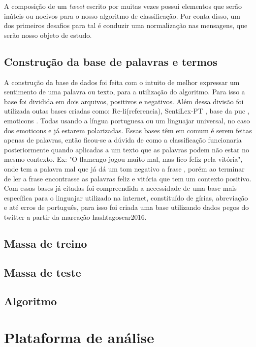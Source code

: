 A composição de um \textit{tweet} escrito por muitas vezes possui elementos que serão inúteis ou nocivos para o nosso algoritmo de classificação. Por conta disso, um dos primeiros desafios para tal é conduzir uma normalização nas mensagens, que serão nosso objeto de estudo.


\subsection{Construção da base de palavras e termos}
A construção da base de dados foi feita com o intuito de melhor expressar um sentimento de uma palavra ou texto, para a utilização do algoritmo. Para isso a base foi dividida em dois arquivos, positivos e negativos. Além dessa divisão foi utilizada outas bases criadas como: Re-li(referencia), SentiLex-PT \cite{marioj.silvapaulacarvalholuissarmento2012}, base da puc \cite{freitas2013construccao}, emoticons \cite{alexanderhogenboomdaniellabalflaviusfrasincarmalissabalfranciskadejonguzaykaymak}. Todas usando a língua portuguesa ou um linguajar universal, no caso dos emoticons e já estarem polarizadas. Essas bases têm em comum é serem feitas apenas de palavras, então ficou-se a dúvida de como a classificação funcionaria posteriormente quando aplicadas a um texto que as palavras podem não estar no mesmo contexto. Ex: "O flamengo jogou muito mal, mas fico feliz pela vitória", onde tem a palavra mal que já dá um tom negativo a frase , porém ao terminar de ler a frase encontrasse as palavras feliz e vitória que tem um contexto positivo.
Com essas bases já citadas foi compreendida a necessidade de uma base mais específica para o linguajar utilizado na internet, constituído de  
gírias, abreviação e até erros de português, para isso foi criada uma base utilizando dados pegos do twitter a partir da marcação hashtagoscar2016.


\subsection{Massa de treino}

\subsection{Massa de teste}

\subsection{Algoritmo}


\section{Plataforma de análise}
